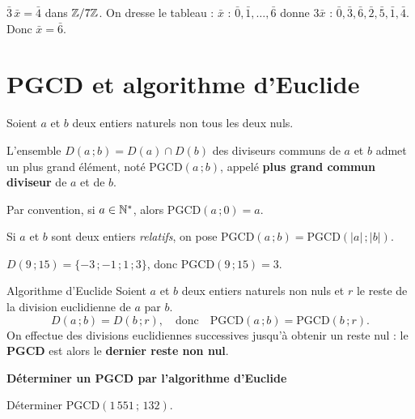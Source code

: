 \begin{exemple}
	$\bar 3\,\bar x = \bar 4$ dans $\mathbb{Z}/7\mathbb{Z}$. On dresse le tableau :
	$\bar x$ : $\bar0,\bar1,\ldots,\bar6$ donne $3\bar x$ :
	$\bar0,\bar3,\bar6,\bar2,\bar5,\bar1,\bar4$. Donc $\bar x = \bar 6$.
\end{exemple}




\section{PGCD et algorithme d'Euclide}

\begin{definition}
	Soient $a$ et $b$ deux entiers naturels non tous les deux nuls.

	L'ensemble $D(a\,;b) = D(a) \cap D(b)$ des diviseurs communs de $a$ et $b$ admet
	un plus grand élément, noté $\mathrm{PGCD}(a\,;b)$, appelé \textbf{plus grand commun diviseur}
	de $a$ et de $b$.

	Par convention, si $a \in \mathbb{N}^*$, alors $\mathrm{PGCD}(a\,;0) = a$.
\end{definition}

\remarque
Si $a$ et $b$ sont deux entiers \emph{relatifs}, on pose
$\mathrm{PGCD}(a\,;b) = \mathrm{PGCD}(|a|\,;|b|)$.

\begin{exemple}
	$D(9\,;15) = \{-3\,;-1\,;1\,;3\}$, donc $\mathrm{PGCD}(9\,;15) = 3$.
\end{exemple}

\begin{propriete}{Algorithme d'Euclide}{}
	Soient $a$ et $b$ deux entiers naturels non nuls et $r$ le reste de la division euclidienne
	de $a$ par $b$.
	$$
	D(a\,;b) = D(b\,;r), \quad \text{donc} \quad \mathrm{PGCD}(a\,;b) = \mathrm{PGCD}(b\,;r).
	$$
	On effectue des divisions euclidiennes successives jusqu'à obtenir un reste nul :
	le \textbf{PGCD} est alors le \textbf{dernier reste non nul}.
\end{propriete}

\exerciceresolu
\textbf{Déterminer un PGCD par l'algorithme d'Euclide}

Déterminer $\mathrm{PGCD}(1\,551\,;\,132)$.

